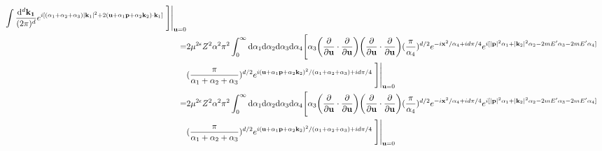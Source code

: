 \documentclass[aps,prd,preprint,showkeys,10pt]{revtex4-1}
\newcommand{\vbp}{\vb{p}}
\newcommand{\vbk}{\vb{k}}
\renewcommand{\a}{\alpha}
\begin{document}
\begin{align*}
	\int\frac{\dd^d\vb{k_1}}{(2\pi)^d}e^{i[(\a_1+\a_2+\a_3)\abs{\vbk_1}^2+2(\vb{u}+\a_1\vbp+\a_2\vbk_2)\cdot\vbk_1]} \eval{\Bigg]}_{\vb{u}=0}\\
	= & 2\mu^{2\epsilon}Z^2\a^2\pi^2
	\int_0^{\infty}\dd\a_1\dd\a_2\dd\a_3\dd\a_4\Bigg[\a_3\pqty{\pdv{\vb{u}}\cdot\pdv{\vb{u}}}\pqty{\pdv{\vb{u}}\cdot\pdv{\vb{u}}}
	(\frac{\pi}{\a_4})^{d/2}e^{-i\vb{x}^2/{\a_4}+id\pi/4}
	e^{i[\abs{\vbp}^2\a_1+\abs{\vbk_2}^2\a_2-2mE'\a_3-2mE'\a_4]}\\&
	(\frac{\pi}{\a_1+\a_2+\a_3})^{d/2}e^{i(\vb{u}+\a_1\vbp+\a_2\vbk_2)^2/(\a_1+\a_2+\a_3)+id\pi/4}\eval{\Bigg]}_{\vb{u}=0}\\
	= & 2\mu^{2\epsilon}Z^2\a^2\pi^2
	\int_0^{\infty}\dd\a_1\dd\a_2\dd\a_3\dd\a_4\Bigg[\a_3\pqty{\pdv{\vb{u}}\cdot\pdv{\vb{u}}}\pqty{\pdv{\vb{u}}\cdot\pdv{\vb{u}}}
	(\frac{\pi}{\a_4})^{d/2}e^{-i\vb{x}^2/{\a_4}+id\pi/4}
	e^{i[\abs{\vbp}^2\a_1+\abs{\vbk_2}^2\a_2-2mE'\a_3-2mE'\a_4]}\\&
	(\frac{\pi}{\a_1+\a_2+\a_3})^{d/2}e^{i(\vb{u}+\a_1\vbp+\a_2\vbk_2)^2/(\a_1+\a_2+\a_3)+id\pi/4}\eval{\Bigg]}_{\vb{u}=0}
\end{align*}
\end{document}
